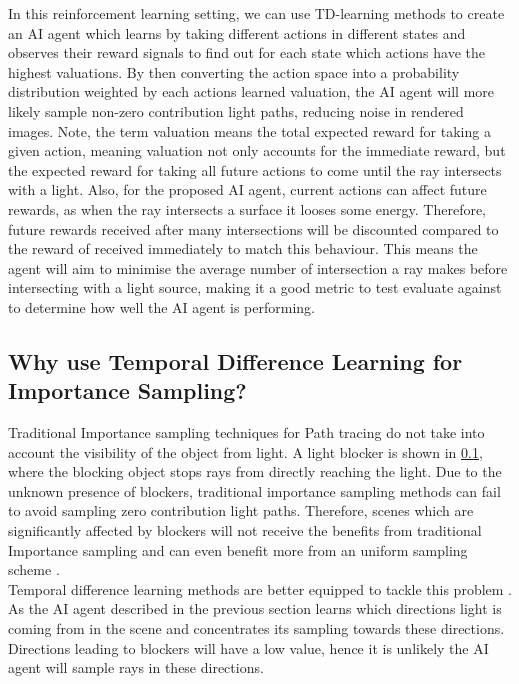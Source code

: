 \documentclass[ %
                    author={Callum Pearce},
                supervisor={Dr. Neill Campbell},
                    degree={MEng},
                     title={How effective are Temporal difference learning methods for reducing the number of zero contribution light paths while still accurately approximating Global Illumination in Path tracing?},
                  subtitle={},
                      type={research},
                      year={2019} ]{dissertation}
\begin{document}
In this reinforcement learning setting, we can use TD-learning methods to create 
an AI agent which learns by taking different actions in different states and observes 
their reward signals to find out for each state which actions have the highest valuations.
By then converting the action space into a probability distribution weighted by each
actions learned valuation, the AI agent will more likely sample non-zero contribution 
light paths, reducing noise in rendered images. Note, the term valuation means the 
total expected reward for taking a given action, meaning valuation not only accounts 
for the immediate reward, but the expected reward for taking all future actions to come 
until the ray intersects with a light. Also, for the proposed AI agent, current actions 
can affect future rewards, as when the ray intersects a surface it looses some energy. 
Therefore, future rewards received after many intersections will be discounted 
compared to the reward of received immediately to match this behaviour. This means 
the agent will aim to minimise the average number of intersection a ray makes before 
intersecting with a light source, making it a good metric to test evaluate against to 
determine how well the AI agent is performing.

\subsection{Why use Temporal Difference Learning for Importance Sampling?}

Traditional Importance sampling techniques for Path tracing do not take into account 
the visibility of the object from light. A light blocker is shown in \ref{}, where the 
blocking object stops rays from directly reaching the light. Due to the unknown 
presence of blockers, traditional importance sampling methods can fail to avoid 
sampling zero contribution light paths. Therefore, scenes which are significantly 
affected by blockers will not receive the benefits from traditional Importance sampling 
and can even benefit more from an uniform sampling scheme 
\cite{ramamoorthi2012theory}.\\


Temporal difference learning methods are better equipped to tackle this problem 
\cite{dahm2017learning}. As the AI agent described in the previous section learns 
which directions light is coming from in the scene and concentrates its sampling 
towards these directions. Directions leading to blockers will have a low value, 
hence it is unlikely the AI agent will sample rays in these directions.\\
\end{document}
